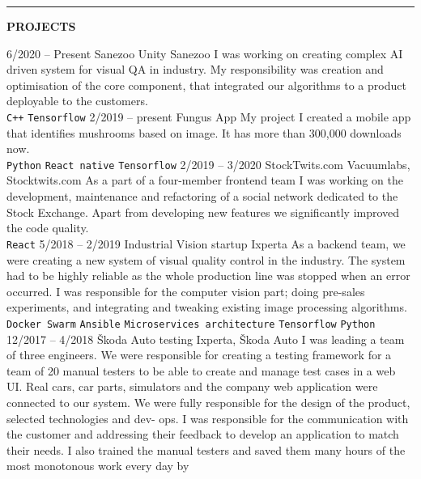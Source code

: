 \documentclass[10pt,A4]{article}
\newcommand{\cvsection}[2] {
\textcolor{sectcol}{\uppercase{\textbf{#1}}}
}
\newcommand{\cvsect}[4]{
	\textcolor{#3}{\hrule}
	\colorbox{#3}{ {\cvsection{#1}{#4}}}
}
\begin{document}
	\cvsect{Projects}{0.49}{thirdcol}{textcol}\\[20pt]
	\begin{entrylist}
		\entry
		{6/2020 -- Present}
		{Sanezoo Unity}
		{Sanezoo}
		{I was working on creating complex AI driven system for visual QA in industry. 
			My responsibility was creation and optimisation of the core component, that integrated our algorithms to a product deployable to the customers. 
			\\ 
			\texttt{C++}\slashsep
			\texttt{Tensorflow}
		}
		\entry
		{2/2019 -- present}
		{Fungus App}
		{My project}
		{I created a mobile app that identifies mushrooms based on
			image. It has more than 300,000 downloads now.
			\\ 
			\texttt{Python}\slashsep
			\texttt{React native}\slashsep
			\texttt{Tensorflow}}
		\entry
		{2/2019 -- 3/2020}
		{StockTwits.com}
		{Vacuumlabs, Stocktwits.com}
		{As a part of a four-member frontend team I was working on the development, maintenance
			and refactoring of a social network dedicated to the Stock Exchange. Apart from
			developing new features we significantly improved the code quality.  
			\\ 
			\texttt{React}}
		\entry
		{5/2018 -- 2/2019}
		{Industrial Vision startup}
		{Ixperta}
		{As a backend team, we were creating a new system of visual quality control in the
			industry. The system had to be highly reliable as the whole production line was stopped
			when an error occurred. I was responsible for the computer vision part; doing pre-sales
			experiments, and integrating and tweaking existing image processing algorithms.
			\\ 
			\texttt{Docker Swarm}\slashsep
			\texttt{Ansible}\slashsep
			\texttt{Microservices architecture}\slashsep
			\texttt{Tensorflow}\slashsep
			\texttt{Python}}
		\entry
		{12/2017 -- 4/2018}
		{Škoda Auto testing}
		{Ixperta, Škoda Auto}
		{I was leading a team of three engineers. We were responsible for creating a testing
			framework for a team of 20 manual testers to be able to create and manage test cases
			in a web UI. Real cars, car parts, simulators and the company web application were
			connected to our system.
			We were fully responsible for the design of the product, selected technologies and dev-
			ops. I was responsible for the communication with the customer and addressing their
			feedback to develop an application to match their needs. I also trained the manual
			testers and saved them many hours of the most monotonous work every day by
}
\end{entrylist}
\end{document}
